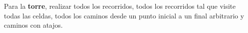 Para la \textbf{torre}, realizar todos los recorridos, todos los recorridos tal que visite todas las celdas, todos los caminos desde un punto inicial a un final arbitrario y caminos con atajos.